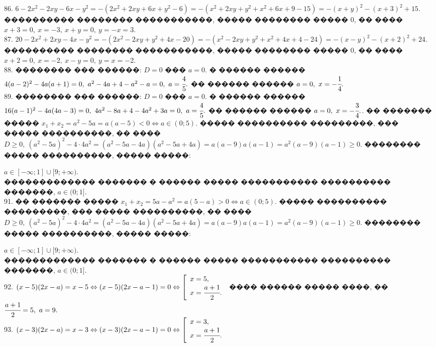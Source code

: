 \documentclass[12pt]{article}
\begin{document}
86. $6-2x^2-2xy-6x-y^2=-(2x^2+2xy+6x+y^2-6)=-(x^2+2xy+y^2+x^2+6x+9-15)=-(x+y)^2-(x+3)^2+15.$ ���������� �������� �����������, ����� �������� ����� 0, �� ���� $x+3=0,\ x=-3,\ x+y=0,\ y=-x=3.$\\
87. $20-2x^2+2xy-4x-y^2=-(2x^2-2xy+y^2+4x-20)=-(x^2-2xy+y^2+x^2+4x+4-24)=-(x-y)^2-(x+2)^2+24.$ ���������� �������� �����������, ����� �������� ����� 0, �� ���� $x+2=0,\ x=-2,\ x-y=0,\ y=x=-2.$\\
88. �������� ��� ������: $D=0$ ��� $a=0.$ � ������ ������ $4(a-2)^2-4a(a+1)=0,\ a^2-4a+4-a^2-a=0,\ a=\cfrac{4}{5}.$ �� ������ ������ $a=0,\ x=-\cfrac{1}{4}.$\\
89. �������� ��� ������: $D=0$ ��� $a=0.$ � ������ ������ $16(a-1)^2-4a(4a-3)=0,\ 4a^2-8a+4-4a^2+3a=0,\ a=\cfrac{4}{5}.$ �� ������ ������ $a=0,\ x=-\cfrac{3}{4}.$\newpage{}. �� ������� ����� $x_1+x_2=a^2-5a=a(a-5)<0\Leftrightarrow a\in(0;5).$ ����� ���������� ���������, ��� ����� ����������, �� ���� $D\geqslant0,\ (a^2-5a)^2-4\cdot4a^2=(a^2-5a-4a)(a^2-5a+4a)=a(a-9)a(a-1)=a^2(a-9)(a-1)\geqslant0.$ �������� ����� ����������, ����� �����:
\begin{figure}[ht!]
\end{figure}
$a\in[-\infty;1]\cup[9;+\infty).$\\ ������������� ������� � ������ ����� ����������� ���������� �������, $a\in (0;1].$\\
91. �� ������� ����� $x_1+x_2=5a-a^2=a(5-a)>0\Leftrightarrow a\in(0;5).$ ����� ���������� ���������, ��� ����� ����������, �� ���� $D\geqslant0,\ (a^2-5a)^2-4\cdot4a^2=(a^2-5a-4a)(a^2-5a+4a)=a(a-9)a(a-1)=a^2(a-9)(a-1)\geqslant0.$ �������� ����� ����������, ����� �����:
\begin{figure}[ht!]
\end{figure}
$a\in[-\infty;1]\cup[9;+\infty).$\\ ������������� ������� � ������ ����� ����������� ���������� �������, $a\in (0;1].$\\
92. $(x-5)(2x-a)=x-5\Leftrightarrow(x-5)(2x-a-1)=0\Leftrightarrow \left[\begin{array}{l}x=5,\\ x=\cfrac{a+1}{2}.\end{array}\right.$
���� ������ ����� ����, �� $\cfrac{a+1}{2}=5,\ a=9.$\\
93. $(x-3)(2x-a)=x-3\Leftrightarrow(x-3)(2x-a-1)=0\Leftrightarrow \left[\begin{array}{l}x=3,\\ x=\cfrac{a+1}{2}.\end{array}\right.$
\end{document}
